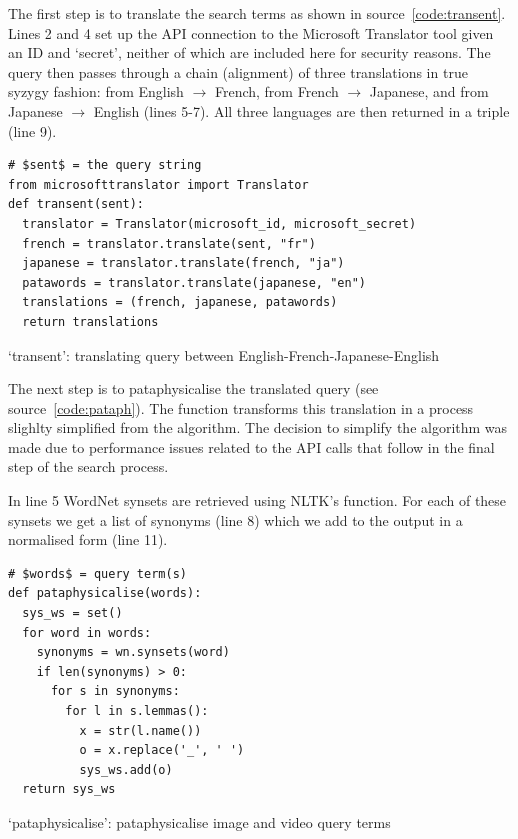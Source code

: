The first step is to translate the search terms as shown in source~\ref{code:transent}. Lines 2 and 4 set up the \ac{API} connection to the Microsoft Translator tool \autocite{TranslatorAPI} given an ID and `secret', neither of which are included here for security reasons. The query  then passes through a chain (alignment) of three translations in true syzygy fashion: from English $\to$ French, from French $\to$ Japanese, and from Japanese $\to$ English (lines 5-7). All three languages are then returned in a triple (line 9).

\begin{listing}[!htbp] %
  \begin{verbatim}
# $sent$ = the query string
from microsofttranslator import Translator
def transent(sent):
  translator = Translator(microsoft_id, microsoft_secret)
  french = translator.translate(sent, "fr")
  japanese = translator.translate(french, "ja")
  patawords = translator.translate(japanese, "en")
  translations = (french, japanese, patawords)
  return translations
  \end{verbatim}
\caption[`transent' function]{`transent': translating query between English-French-Japanese-English}
\label{code:transent}
\end{listing}

The next step is to pataphysicalise the translated query (see source~\ref{code:pataph}). The  function transforms this translation in a process slighlty simplified from the  algorithm. The decision to simplify the algorithm was made due to performance issues related to the \ac{API} calls that follow in the final step of the search process. 

In line 5 WordNet synsets are retrieved using \ac{NLTK}'s  function. For each of these synsets we get a list of synonyms (line 8) which we add to the output in a normalised form (line 11).

\begin{listing}[!htbp] %
  \begin{verbatim}
# $words$ = query term(s)
def pataphysicalise(words):
  sys_ws = set()
  for word in words:
    synonyms = wn.synsets(word)
    if len(synonyms) > 0:
      for s in synonyms:
        for l in s.lemmas():
          x = str(l.name())
          o = x.replace('_', ' ')
          sys_ws.add(o)
  return sys_ws
  \end{verbatim}
\caption[`pataphysicalise' function]{`pataphysicalise': pataphysicalise image and video query terms}
\label{code:pataph}
\end{listing}


